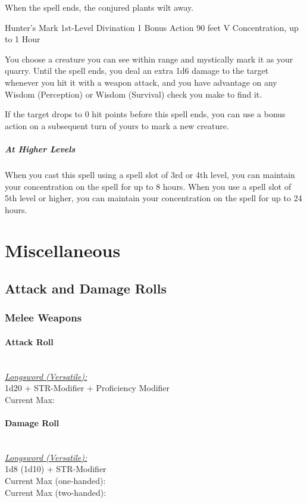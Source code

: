 {When the spell ends, the conjured plants wilt away.

\DndSpellHeader
  {Hunter's Mark}
  {1st-Level Divination}
  {1 Bonus Action}
  {90 feet}
  {V}
  {Concentration, up to 1 Hour}

You choose a creature you can see within range and mystically mark it as your quarry. Until the spell ends, you deal an extra 1d6 damage to the target whenever you hit it with a weapon attack, and you have advantage on any Wisdom (Perception) or Wisdom (Survival) check you make to find it.

If the target drops to 0 hit points before this spell ends, you can use a bonus action on a subsequent turn of yours to mark a new creature.

\subparagraph*{At Higher Levels} When you cast this spell using a spell slot of 3rd or 4th level, you can maintain your concentration on the spell for up to 8 hours. When you use a spell slot of 5th level or higher, you can maintain your concentration on the spell for up to 24 hours.

\vfill\eject
\section*{Miscellaneous}
\subsection*{Attack and Damage Rolls}
\subsubsection*{Melee Weapons}
\paragraph*{Attack Roll}\hfill\\
\underline{\textit{Longsword (Versatile):}}\\
1d20 + STR-Modifier + Proficiency Modifier\\
\indent Current Max: 
\paragraph*{Damage Roll}\hfill\\
\underline{\textit{Longsword (Versatile):}}\\
1d8 (1d10) + STR-Modifier\\
\indent Current Max (one-handed): \\
\indent Current Max (two-handed): 
}
